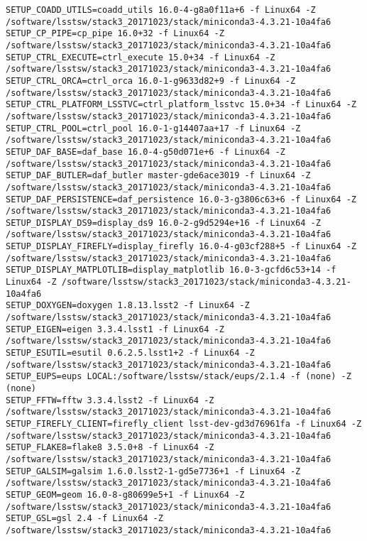\begin{verbatim}
SETUP_COADD_UTILS=coadd_utils 16.0-4-g8a0f11a+6 -f Linux64 -Z /software/lsstsw/stack3_20171023/stack/miniconda3-4.3.21-10a4fa6
SETUP_CP_PIPE=cp_pipe 16.0+32 -f Linux64 -Z /software/lsstsw/stack3_20171023/stack/miniconda3-4.3.21-10a4fa6
SETUP_CTRL_EXECUTE=ctrl_execute 15.0+34 -f Linux64 -Z /software/lsstsw/stack3_20171023/stack/miniconda3-4.3.21-10a4fa6
SETUP_CTRL_ORCA=ctrl_orca 16.0-1-g9633d82+9 -f Linux64 -Z /software/lsstsw/stack3_20171023/stack/miniconda3-4.3.21-10a4fa6
SETUP_CTRL_PLATFORM_LSSTVC=ctrl_platform_lsstvc 15.0+34 -f Linux64 -Z /software/lsstsw/stack3_20171023/stack/miniconda3-4.3.21-10a4fa6
SETUP_CTRL_POOL=ctrl_pool 16.0-1-g14407aa+17 -f Linux64 -Z /software/lsstsw/stack3_20171023/stack/miniconda3-4.3.21-10a4fa6
SETUP_DAF_BASE=daf_base 16.0-4-g50d071e+6 -f Linux64 -Z /software/lsstsw/stack3_20171023/stack/miniconda3-4.3.21-10a4fa6
SETUP_DAF_BUTLER=daf_butler master-gde6ace3019 -f Linux64 -Z /software/lsstsw/stack3_20171023/stack/miniconda3-4.3.21-10a4fa6
SETUP_DAF_PERSISTENCE=daf_persistence 16.0-3-g3806c63+6 -f Linux64 -Z /software/lsstsw/stack3_20171023/stack/miniconda3-4.3.21-10a4fa6
SETUP_DISPLAY_DS9=display_ds9 16.0-2-g9d5294e+16 -f Linux64 -Z /software/lsstsw/stack3_20171023/stack/miniconda3-4.3.21-10a4fa6
SETUP_DISPLAY_FIREFLY=display_firefly 16.0-4-g03cf288+5 -f Linux64 -Z /software/lsstsw/stack3_20171023/stack/miniconda3-4.3.21-10a4fa6
SETUP_DISPLAY_MATPLOTLIB=display_matplotlib 16.0-3-gcfd6c53+14 -f Linux64 -Z /software/lsstsw/stack3_20171023/stack/miniconda3-4.3.21-10a4fa6
SETUP_DOXYGEN=doxygen 1.8.13.lsst2 -f Linux64 -Z /software/lsstsw/stack3_20171023/stack/miniconda3-4.3.21-10a4fa6
SETUP_EIGEN=eigen 3.3.4.lsst1 -f Linux64 -Z /software/lsstsw/stack3_20171023/stack/miniconda3-4.3.21-10a4fa6
SETUP_ESUTIL=esutil 0.6.2.5.lsst1+2 -f Linux64 -Z /software/lsstsw/stack3_20171023/stack/miniconda3-4.3.21-10a4fa6
SETUP_EUPS=eups LOCAL:/software/lsstsw/stack/eups/2.1.4 -f (none) -Z (none)
SETUP_FFTW=fftw 3.3.4.lsst2 -f Linux64 -Z /software/lsstsw/stack3_20171023/stack/miniconda3-4.3.21-10a4fa6
SETUP_FIREFLY_CLIENT=firefly_client lsst-dev-gd3d76961fa -f Linux64 -Z /software/lsstsw/stack3_20171023/stack/miniconda3-4.3.21-10a4fa6
SETUP_FLAKE8=flake8 3.5.0+8 -f Linux64 -Z /software/lsstsw/stack3_20171023/stack/miniconda3-4.3.21-10a4fa6
SETUP_GALSIM=galsim 1.6.0.lsst2-1-gd5e7736+1 -f Linux64 -Z /software/lsstsw/stack3_20171023/stack/miniconda3-4.3.21-10a4fa6
SETUP_GEOM=geom 16.0-8-g80699e5+1 -f Linux64 -Z /software/lsstsw/stack3_20171023/stack/miniconda3-4.3.21-10a4fa6
SETUP_GSL=gsl 2.4 -f Linux64 -Z /software/lsstsw/stack3_20171023/stack/miniconda3-4.3.21-10a4fa6

\end{verbatim}
